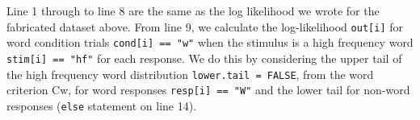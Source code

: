 \documentclass[]{book}
\newenvironment{Shaded}{\begin{snugshade}}{\end{snugshade}}
\newcommand{\ControlFlowTok}[1]{\textcolor[rgb]{0.13,0.29,0.53}{\textbf{#1}}}
\newcommand{\DataTypeTok}[1]{\textcolor[rgb]{0.13,0.29,0.53}{#1}}
\newcommand{\DecValTok}[1]{\textcolor[rgb]{0.00,0.00,0.81}{#1}}
\newcommand{\KeywordTok}[1]{\textcolor[rgb]{0.13,0.29,0.53}{\textbf{#1}}}
\newcommand{\NormalTok}[1]{#1}
\newcommand{\OperatorTok}[1]{\textcolor[rgb]{0.81,0.36,0.00}{\textbf{#1}}}
\newcommand{\OtherTok}[1]{\textcolor[rgb]{0.56,0.35,0.01}{#1}}
\newcommand{\StringTok}[1]{\textcolor[rgb]{0.31,0.60,0.02}{#1}}
\begin{document}
\begin{Shaded}
\end{Shaded}

Line 1 through to line 8 are the same as the log likelihood we wrote for the fabricated dataset above. From line 9, we calculate the log-likelihood \texttt{out{[}i{]}} for word condition trials \texttt{cond{[}i{]}\ ==\ "w"} when the stimulus is a high frequency word \texttt{stim{[}i{]}\ ==\ "hf"} for each response. We do this by considering the upper tail of the high frequency word distribution \texttt{lower.tail\ =\ FALSE}, from the word criterion Cw, for word responses \texttt{resp{[}i{]}\ ==\ "W"} and the lower tail for non-word responses (\texttt{else} statement on line 14).
\end{document}
